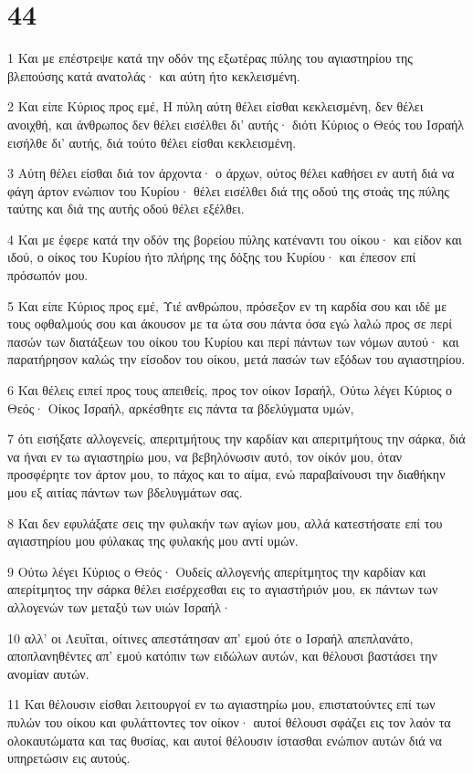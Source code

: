 \chapter{44}

\par 1 Και με επέστρεψε κατά την οδόν της εξωτέρας πύλης του αγιαστηρίου της βλεπούσης κατά ανατολάς· και αύτη ήτο κεκλεισμένη.
\par 2 Και είπε Κύριος προς εμέ, Η πύλη αύτη θέλει είσθαι κεκλεισμένη, δεν θέλει ανοιχθή, και άνθρωπος δεν θέλει εισέλθει δι' αυτής· διότι Κύριος ο Θεός του Ισραήλ εισήλθε δι' αυτής, διά τούτο θέλει είσθαι κεκλεισμένη.
\par 3 Αύτη θέλει είσθαι διά τον άρχοντα· ο άρχων, ούτος θέλει καθήσει εν αυτή διά να φάγη άρτον ενώπιον του Κυρίου· θέλει εισέλθει διά της οδού της στοάς της πύλης ταύτης και διά της αυτής οδού θέλει εξέλθει.
\par 4 Και με έφερε κατά την οδόν της βορείου πύλης κατέναντι του οίκου· και είδον και ιδού, ο οίκος του Κυρίου ήτο πλήρης της δόξης του Κυρίου· και έπεσον επί πρόσωπόν μου.
\par 5 Και είπε Κύριος προς εμέ, Υιέ ανθρώπου, πρόσεξον εν τη καρδία σου και ιδέ με τους οφθαλμούς σου και άκουσον με τα ώτα σου πάντα όσα εγώ λαλώ προς σε περί πασών των διατάξεων του οίκου του Κυρίου και περί πάντων των νόμων αυτού· και παρατήρησον καλώς την είσοδον του οίκου, μετά πασών των εξόδων του αγιαστηρίου.
\par 6 Και θέλεις ειπεί προς τους απειθείς, προς τον οίκον Ισραήλ, Ούτω λέγει Κύριος ο Θεός· Οίκος Ισραήλ, αρκέσθητε εις πάντα τα βδελύγματα υμών,
\par 7 ότι εισήξατε αλλογενείς, απεριτμήτους την καρδίαν και απεριτμήτους την σάρκα, διά να ήναι εν τω αγιαστηρίω μου, να βεβηλόνωσιν αυτό, τον οίκόν μου, όταν προσφέρητε τον άρτον μου, το πάχος και το αίμα, ενώ παραβαίνουσι την διαθήκην μου εξ αιτίας πάντων των βδελυγμάτων σας.
\par 8 Και δεν εφυλάξατε σεις την φυλακήν των αγίων μου, αλλά κατεστήσατε επί του αγιαστηρίου μου φύλακας της φυλακής μου αντί υμών.
\par 9 Ούτω λέγει Κύριος ο Θεός· Ουδείς αλλογενής απερίτμητος την καρδίαν και απερίτμητος την σάρκα θέλει εισέρχεσθαι εις το αγιαστήριόν μου, εκ πάντων των αλλογενών των μεταξύ των υιών Ισραήλ·
\par 10 αλλ' οι Λευΐται, οίτινες απεστάτησαν απ' εμού ότε ο Ισραήλ απεπλανάτο, αποπλανηθέντες απ' εμού κατόπιν των ειδώλων αυτών, και θέλουσι βαστάσει την ανομίαν αυτών.
\par 11 Και θέλουσιν είσθαι λειτουργοί εν τω αγιαστηρίω μου, επιστατούντες επί των πυλών του οίκου και φυλάττοντες τον οίκον· αυτοί θέλουσι σφάζει εις τον λαόν τα ολοκαυτώματα και τας θυσίας, και αυτοί θέλουσιν ίστασθαι ενώπιον αυτών διά να υπηρετώσιν εις αυτούς.
